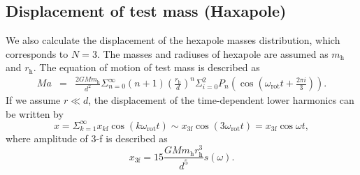 \documentclass[A4]{spie}  %
\begin{document}
\subsection{Displacement of test mass (Haxapole)} \label{Hexa}
We also calculate the displacement of the hexapole masses distribution, which corresponds to $N=3$.
The masses and radiuses of hexapole are assumed as $m_{\mathrm{h}}$ and $r_{\mathrm{h}}$. 
The equation of motion of test mass is described as
\begin{eqnarray}
Ma &=& \frac{2GMm_{\mathrm{h}}}{d^2}\Sigma^{\infty}_{n=0}(n+1) \left( \frac{r_{\mathrm{h}}}{d} \right)^n \Sigma^2_{i=0} P_n \left(\cos{\left(\omega_{\mathrm{rot}} t+\frac{2\pi i}{3} \right)} \right).
\end{eqnarray} 
If we assume $r \ll d$, the displacement of the time-dependent lower harmonics can be written by 
\begin{equation}
x=\Sigma_{k=1}^{\infty}x_{k\mathrm{f}}\cos(k\omega_{\mathrm{rot}} t)\sim  x_{3\mathrm{f}}\cos(3\omega_{\mathrm{rot}} t)=x_{\mathrm{3f}}\cos{\omega t},
\end{equation}
where amplitude of 3-f is described as
\begin{equation}
 x_{3\mathrm{f}}=15\frac{GMm_{\mathrm{h}}r_{\mathrm{h}}^3}{d^5}s(\omega). \label{3f}
\end{equation}
\end{document}
